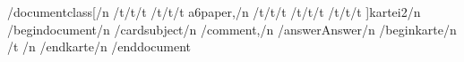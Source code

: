 /documentclass[/n
/t/t/t			%
/t/t/t			a6paper,/n
/t/t/t			%
/t/t/t			%
/t/t/t			]{kartei2}/n
/begin{document}/n
/cardsubject{}/n
/comment{,}/n
/answer{Answer}/n
/begin{karte}{}/n
/t	/n
/end{karte}/n
/end{document}
